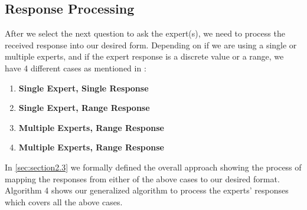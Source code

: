 \begin{comment}
        \item Q3 = D(MLN, SHN): Since $C_Q3 = {c_2}$, we need to sum the bounds overlap of $c_2$ and $c_1$ with $c_2$ and $c_3$. We will have:
        \begin{align*}
            QEF(Q3) = 1.5 + 1 = 2.5
        \end{align*}
        
        \item Q4 = Since $C_Q4 = {c_3}$, we need to sum the bounds overlap of $c_3$ and $c_1$ with $c_3$ and $c_2$. Therefore:
        \begin{align*}
            QEF(Q4) = 1.5 + 1.5 = 3.0
        \end{align*}
    \end{itemize}
    Hence, since $QEF(Q4)$ has the highest value compared to others, we choose $Q4 = D(MLN, WLD)$ as the next question. 
\end{itemize}

\end{comment}


\subsection{Response Processing}
\label{Response_Processing}
After we select the next question to ask the expert(s), we need to process the received response into our desired form. Depending on if we are using a single or multiple experts, and if the expert response is a discrete value or a range, we have 4 different cases as mentioned in :

\begin{enumerate}
    \item \textbf{Single Expert, Single Response}
    \item \textbf{Single Expert, Range Response}
    \item \textbf{Multiple Experts, Range Response}
    \item \textbf{Multiple Experts, Range Response}
\end{enumerate}

In \autoref{sec:section2.3} we formally defined the overall approach showing the process of mapping the responses from either of the above cases to our desired format. Algorithm 4 shows our generalized algorithm to process the experts' responses which covers all the above cases. 

